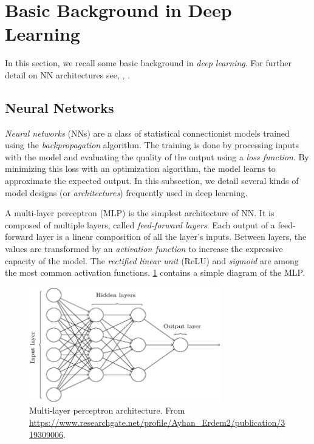 \section{Basic Background in Deep Learning\label{sec:background_nn}}
In this section, we recall some basic background in \textit{deep learning}. For further detail on NN architectures see, \eg, \cite{tuto-lstm:2019:staudemeyer}.

\subsection{Neural Networks\label{sec:nn}}
\textit{Neural networks} (NNs) are a class of statistical connectionist models trained using the \textit{backpropagation} algorithm.
The training is done by processing inputs with the model and evaluating the quality of the output using a \textit{loss function}.
By minimizing this loss with an optimization algorithm, the model learns to approximate the expected output.
In this subsection, we detail several kinds of model designs (or \textit{architectures}) frequently used in deep learning.

A multi-layer perceptron (MLP) is the simplest architecture of NN.
It is composed of multiple layers, called \textit{feed-forward layers}.
Each output of a feed-forward layer is a linear composition of all the layer's inputs.
Between layers, the values are transformed by an \textit{activation function} to increase the expressive capacity of the model.
The \textit{rectified linear unit} (ReLU) and \textit{sigmoid} are among the most common activation functions.
\cref{fig:basic-nn-architectures} contains a simple diagram of the MLP.

\begin{figure}
    \centering
    \includegraphics[keepaspectratio, width=.9\textwidth, height=5cm]{Figures/Ch0/mlp}
    \caption{Multi-layer perceptron architecture. From \footnotesize{\url{https://www.researchgate.net/profile/Ayhan_Erdem2/publication/319309006}}.}
    \label{fig:basic-nn-architectures}
\end{figure}

